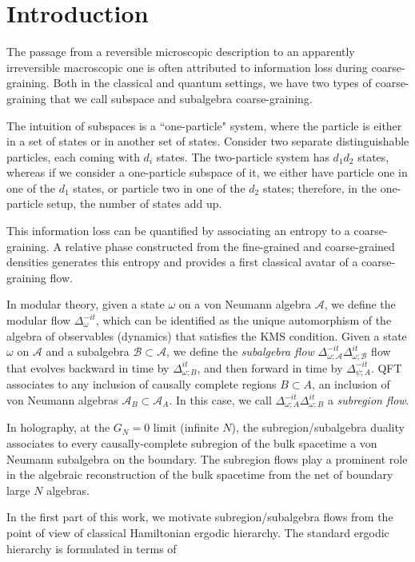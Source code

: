 \documentclass[a4paper,11pt]{article}
\theoremstyle{definition}
\newcommand{\mA}{\mathcal{A}}
\begin{document}
\section{Introduction}


The passage from a reversible microscopic description to an apparently irreversible macroscopic one is often attributed to information loss during coarse-graining. Both in the classical and quantum settings, we have two types of coarse-graining that we call subspace and subalgebra coarse-graining.


The intuition of subspaces is a ``one-particle" system, where the particle is either in a set of states or in another set of states. Consider two separate distinguishable particles, each coming with $d_i$ states. The two-particle system has $d_1d_2$ states, whereas if we consider a one-particle subspace of it, we either have particle one in one of the $d_1$ states, or particle two in one of the $d_2$ states; therefore, in the one-particle setup, the number of states add up.

This information loss can be quantified by associating an entropy to a coarse-graining. A relative phase constructed from the fine-grained and coarse-grained densities generates this entropy and provides a first classical avatar of a coarse-graining flow. 


In modular theory, given a state $\omega$ on a von Neumann algebra $\mA$, we define the modular flow $\Delta_\omega^{-it}$, which can be identified as the unique automorphism of the algebra of observables (dynamics) that satisfies the KMS condition. Given a state $\omega$ on $\mA$ and a subalgebra $\mathcal{B}\subset \mA$, we define the {\it subalgebra flow} $\Delta_{\omega;\mA}^{-it}\Delta_{\omega;\mathcal{B}}^{it}$ flow that evolves backward in time by $\Delta_{\omega;B}^{it}$, and then forward in time by $\Delta_{\psi;A}^{-it}$. QFT associates to any inclusion of causally complete regions $B\subset A$, an inclusion of von Neumann algebras $\mA_B\subset \mA_A$. In this case, we call $\Delta_{\omega;A}^{-it}\Delta_{\omega;B}^{it}$ a {\it subregion flow}.

In holography, at the $G_N=0$ limit (infinite $N$), the subregion/subalgebra duality associates to every causally-complete subregion of the bulk spacetime a von Neumann subalgebra on the boundary. The subregion flows play a prominent role in the algebraic reconstruction of the bulk spacetime from the net of boundary large $N$ algebras. 

In the first part of this work, we motivate subregion/subalgebra flows from the point of view of classical Hamiltonian ergodic hierarchy. The standard ergodic hierarchy is formulated in terms of 
\end{document}
